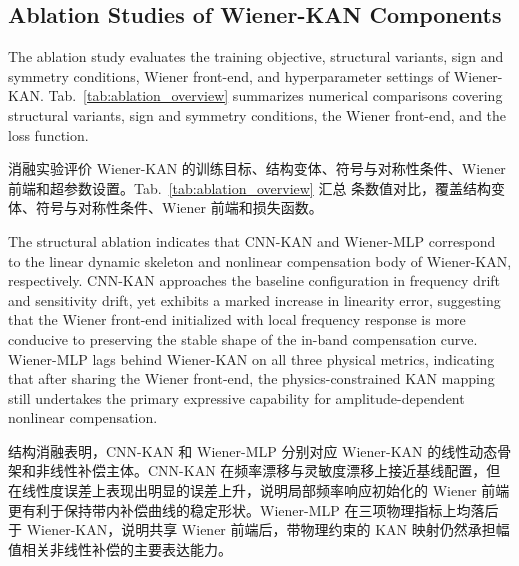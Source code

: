 \documentclass[sn-nature]{sn-jnl}
\newif\ifCNENEnglish
\newif\ifCNENBilingual
\newcommand{\CNEN}[2]{%
    \ifCNENBilingual
        #1%
        \if\relax\detokenize{#2}\relax\else\par #2\fi%
    \else
        \ifCNENEnglish
            #2%
        \else
            #1%
        \fi
    \fi
}
\begin{document}
\subsection{Ablation Studies of Wiener-KAN Components}

\CNEN{消融实验评价 Wiener-KAN 的训练目标、结构变体、符号与对称性条件、Wiener 前端和超参数设置。Tab.~\ref{tab:ablation_overview} 汇总 \valAblationOverviewRowCount{} 条数值对比，覆盖结构变体、符号与对称性条件、Wiener 前端和损失函数。}{The ablation study evaluates the training objective, structural variants, sign and symmetry conditions, Wiener front-end, and hyperparameter settings of Wiener-KAN. Tab.~\ref{tab:ablation_overview} summarizes \valAblationOverviewRowCount{} numerical comparisons covering structural variants, sign and symmetry conditions, the Wiener front-end, and the loss function.%
}

\begin{table}[ht]
    \centering
    \small
    \setlength{\tabcolsep}{2pt}
    \caption{Numerical overview of Wiener-KAN ablation studies. Each row reports the evaluated physical-metric triplet for one design contrast.}
    \label{tab:ablation_overview}
    \resizebox{\textwidth}{!}{}
\end{table}

\CNEN{结构消融表明，CNN-KAN 和 Wiener-MLP 分别对应 Wiener-KAN 的线性动态骨架和非线性补偿主体。CNN-KAN 在频率漂移与灵敏度漂移上接近基线配置，但在线性度误差上表现出明显的误差上升，说明局部频率响应初始化的 Wiener 前端更有利于保持带内补偿曲线的稳定形状。Wiener-MLP 在三项物理指标上均落后于 Wiener-KAN，说明共享 Wiener 前端后，带物理约束的 KAN 映射仍然承担幅值相关非线性补偿的主要表达能力。}{The structural ablation indicates that CNN-KAN and Wiener-MLP correspond to the linear dynamic skeleton and nonlinear compensation body of Wiener-KAN, respectively. CNN-KAN approaches the baseline configuration in frequency drift and sensitivity drift, yet exhibits a marked increase in linearity error, suggesting that the Wiener front-end initialized with local frequency response is more conducive to preserving the stable shape of the in-band compensation curve. Wiener-MLP lags behind Wiener-KAN on all three physical metrics, indicating that after sharing the Wiener front-end, the physics-constrained KAN mapping still undertakes the primary expressive capability for amplitude-dependent nonlinear compensation.%
}
\end{document}
